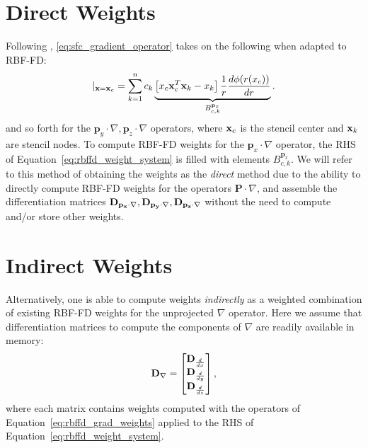 \section{Direct Weights} 

Following \cite{FlyerLehto11}, \ref{eq:sfc_gradient_operator} takes on the following when adapted to RBF-FD:  
\begin{equation}
[ \mathbf{p}_{x} \cdot \nabla{f(\vx)}] |_{\vx = \vx_{c}} = \sum_{k=1}^{n} c_{k} \underbrace{\left[ x_{c} \vx_{c}^{T} \vx_{k} - x_{k} \right] \frac{1}{r} \d{\phi(r(x_{c}))}{r}}_{B_{c,k}^{\mathbf{p}_{x}}}. 
\label{eq:xsfc_operator_flyer_et_al}
\end{equation}
and so forth for the $\mathbf{p}_{y} \cdot \nabla, \mathbf{p}_{z}  \cdot \nabla$ operators, where $\mathbf{x}_{c}$ is the stencil center and $\mathbf{x}_{k}$ are stencil nodes. To compute RBF-FD weights for the $\mathbf{p}_{x} \cdot \nabla$ operator, the RHS of Equation~\ref{eq:rbffd_weight_system} is filled with elements $B_{c,k}^{\mathbf{p}_{x}}$. We will refer to this method of obtaining the weights as the \emph{direct} method due to the ability to directly compute RBF-FD weights for the operators $\mathbf{P} \cdot \nabla $, and assemble the differentiation matrices $\mathbf{D}_{\mathbf{p_{x}} \cdot \nabla}, \mathbf{D}_{\mathbf{p_{y}} \cdot \nabla}, \mathbf{D}_{\mathbf{p_{z}} \cdot \nabla}$ without the need to compute   and/or store other weights.

\section{Indirect Weights} 


Alternatively, one is able to compute weights \emph{indirectly} as a weighted combination of existing RBF-FD weights for the unprojected $\nabla$ operator. Here we assume that differentiation matrices to compute the components of $\nabla$ are readily available in memory: 
$$
\mathbf{D}_{\nabla} = \begin{bmatrix} \mathbf{D}_{\frac{d }{d x}} \\ \mathbf{D}_{\frac{d }{d y}} \\ \mathbf{D}_{\frac{d }{d z}} \end{bmatrix},
$$
where each matrix contains weights computed with the operators of Equation~\ref{eq:rbffd_grad_weights} applied to the RHS of Equation~\ref{eq:rbffd_weight_system}.  


